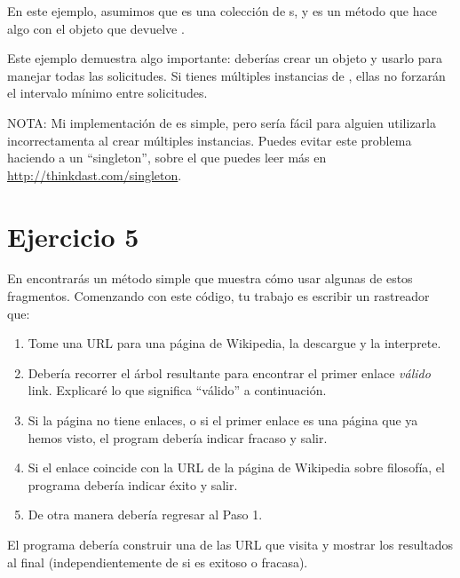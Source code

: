 \documentclass[12pt]{book}
\theoremstyle{exercise}
\begin{document}
En este ejemplo, asumimos que  es una colección de
s, y  es un método que hace algo
con el objeto  que devuelve .

Este ejemplo demuestra algo importante: deberías crear un
objeto  y usarlo para manejar todas las solicitudes. Si
tienes múltiples instancias de , ellas no forzarán el
intervalo mínimo entre solicitudes.


NOTA: Mi implementación de  es simple, pero sería
fácil para alguien utilizarla incorrectamenta al crear múltiples instancias.
Puedes evitar este problema haciendo a  un ``singleton'',
sobre el que puedes leer más en
\url{http://thinkdast.com/singleton}.


\section{Ejercicio 5}
\label{exercise5}

En  encontrarás un método 
simple que muestra cómo usar algunas de estos fragmentos. Comenzando con
este código, tu trabajo es escribir un rastreador que:

\begin{enumerate}

\item
  Tome una URL para una página de Wikipedia, la descargue y la interprete.

\item
  Debería recorrer el árbol resultante para encontrar el primer
  enlace \emph{válido} link. Explicaré lo que significa ``válido'' a continuación.

\item
  Si la página no tiene enlaces, o si el primer enlace es una página que ya
  hemos visto, el program debería indicar fracaso y salir.

\item
  Si el enlace coincide con la URL de la página de Wikipedia sobre filosofía,
  el programa debería indicar éxito y salir.

\item
  De otra manera debería regresar al Paso 1.

\end{enumerate}

El programa debería construir una  de las URL que visita y
mostrar los resultados al final (independientemente de si es exitoso o fracasa).
\end{document}
